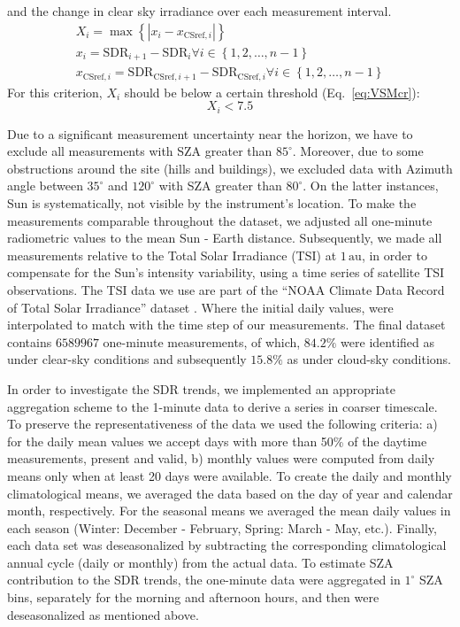 \documentclass[applsci,article,submit,moreauthors,pdftex]{Definitions/mdpi}
\begin{document}
\begin{enumerate}
  and the change in clear sky irradiance over each measurement interval.
  \begin{gather}
    X_i = \max{\left \{ \left | x_i - x_{\text{CSref},i} \right | \right \}} \label{eq:VSM3} \\
    x_i = \text{SDR}_{i+1} - \text{SDR}_{i} \forall i \in \left \{ 1, 2, \ldots, n-1 \right \} \label{eq:VSM1} \\
    x_{\text{CSref},i} = \text{SDR}_{\text{CSref},i+1} - \text{SDR}_{\text{CSref},i} \forall i \in \left \{ 1, 2, \ldots, n-1 \right \} \label{eq:VSM2}
  \end{gather} For this criterion, \(X_i\) should be below a certain
  threshold (Eq.~\ref{eq:VSMcr}): \begin{equation}
    X_i < 7.5 \label{eq:VSMcr}
  \end{equation}
\end{enumerate}

Due to a significant measurement uncertainty near the horizon, we have
to exclude all measurements with SZA greater than \(85^\circ\).
Moreover, due to some obstructions around the site (hills and
buildings), we excluded data with Azimuth angle between \(35^\circ\) and
\(120^\circ\) with SZA greater than \(80^\circ\). On the latter
instances, Sun is systematically, not visible by the instrument's
location. To make the measurements comparable throughout the dataset, we
adjusted all one-minute radiometric values to the mean Sun - Earth
distance. Subsequently, we made all measurements relative to the Total
Solar Irradiance (TSI) at \(1\,\text{au}\), in order to compensate for
the Sun's intensity variability, using a time series of satellite TSI
observations. The TSI data we use are part of the ``NOAA Climate Data
Record of Total Solar Irradiance'' dataset \citep{Coddington2005}. Where
the initial daily values, were interpolated to match with the time step
of our measurements. The final dataset contains \(6589967\) one-minute
measurements, of which, \(84.2\%\) were identified as under clear-sky
conditions and subsequently \(15.8\%\) as under cloud-sky conditions.

In order to investigate the SDR trends, we implemented an appropriate
aggregation scheme to the 1-minute data to derive a series in coarser
timescale. To preserve the representativeness of the data we used the
following criteria: a) for the daily mean values we accept days with
more than 50\% of the daytime measurements, present and valid, b)
monthly values were computed from daily means only when at least 20 days
were available. To create the daily and monthly climatological means, we
averaged the data based on the day of year and calendar month,
respectively. For the seasonal means we averaged the mean daily values
in each season (Winter: December - February, Spring: March - May, etc.).
Finally, each data set was deseasonalized by subtracting the
corresponding climatological annual cycle (daily or monthly) from the
actual data. To estimate SZA contribution to the SDR trends, the
one-minute data were aggregated in \(1^\circ\) SZA bins, separately for
the morning and afternoon hours, and then were deseasonalized as
mentioned above.
\end{document}
